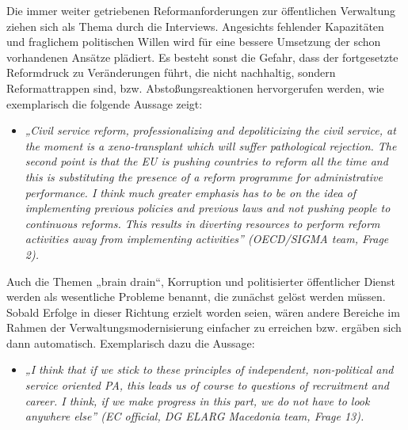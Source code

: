 Die immer weiter getriebenen Reformanforderungen zur öffentlichen Verwaltung ziehen sich als Thema durch die Interviews. Angesichts fehlender Kapazitäten und fraglichem politischen Willen wird für eine bessere Umsetzung der schon vorhandenen Ansätze plädiert. Es besteht sonst die Gefahr, dass der fortgesetzte Reformdruck zu Veränderungen führt, die nicht nachhaltig, sondern Reformattrappen sind, bzw. Abstoßungsreaktionen hervorgerufen werden, wie exemplarisch die folgende Aussage zeigt:
\begin{itemize}[label={}]
\item \textit{„Civil service reform, professionalizing and depoliticizing the civil service, at the moment is a xeno-transplant which will suffer pathological rejection. The second point is that the EU is pushing countries to reform all the time and this is substituting the presence of a reform programme for administrative performance. I think much greater emphasis has to be on the idea of implementing previous policies and previous laws and not pushing people to continuous reforms. This results in diverting resources to perform reform activities away from implementing activities” (OECD/SIGMA team, Frage 2).}
\end{itemize}
Auch die Themen „brain drain“, Korruption und politisierter öffentlicher Dienst werden als wesentliche Probleme benannt, die zunächst gelöst werden müssen. Sobald Erfolge in dieser Richtung erzielt worden seien, wären andere Bereiche im Rahmen der Verwaltungsmodernisierung einfacher zu erreichen bzw. ergäben sich dann automatisch. Exemplarisch dazu die Aussage:
\begin{itemize}[label={}]
\item \textit{„I think that if we stick to these principles of independent, non-political and service oriented PA, this leads us of course to questions of recruitment and career. I think, if we make progress in this part, we do not have to look anywhere else” (EC official, DG ELARG Macedonia team, Frage 13).}
\end{itemize}

